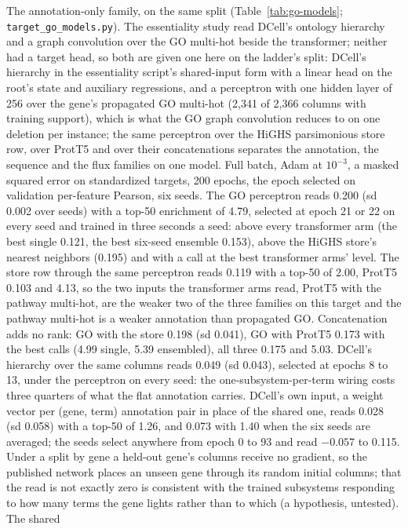 The annotation-only family, on the same split (Table~\ref{tab:go-models};
\texttt{target\_go\_models.py}). The essentiality study read DCell's ontology hierarchy
and a graph convolution over the GO multi-hot beside the transformer; neither had a
target head, so both are given one here on the ladder's split: DCell's hierarchy in the
essentiality script's shared-input form with a linear head on the root's state and
auxiliary regressions, and a perceptron with one hidden layer of 256 over the gene's
propagated GO multi-hot (2,341 of 2,366 columns with training support), which is what
the GO graph convolution reduces to on one deletion per instance; the same perceptron
over the HiGHS parsimonious store row, over ProtT5 and over their concatenations
separates the annotation, the sequence and the flux families on one model. Full batch,
Adam at $10^{-3}$, a masked squared error on standardized targets, 200 epochs, the
epoch selected on validation per-feature Pearson, six seeds. The GO perceptron reads
0.200 (sd 0.002 over seeds) with a top-50 enrichment of 4.79, selected at epoch 21 or
22 on every seed and trained in three seconds a seed: above every transformer arm (the
best single 0.121, the best six-seed ensemble 0.153), above the HiGHS store's nearest
neighbors (0.195) and with a call at the best transformer arms' level. The store row
through the same perceptron reads 0.119 with a top-50 of 2.00, ProtT5 0.103 and 4.13,
so the two inputs the transformer arms read, ProtT5 with the pathway multi-hot, are
the weaker two of the three families on this target and the pathway multi-hot is a
weaker annotation than propagated GO. Concatenation adds no rank: GO with the store
0.198 (sd 0.041), GO with ProtT5 0.173 with the best calls (4.99 single, 5.39
ensembled), all three 0.175 and 5.03. DCell's hierarchy over the same columns reads
0.049 (sd 0.043), selected at epochs 8 to 13, under the perceptron on every seed: the
one-subsystem-per-term wiring costs three quarters of what the flat annotation carries.
DCell's own input, a weight vector per (gene, term) annotation pair in place of the
shared one, reads 0.028 (sd 0.058) with a top-50 of 1.26, and 0.073 with 1.40 when the
six seeds are averaged; the seeds select anywhere from epoch 0 to 93 and read $-0.057$
to 0.115. Under a split by gene a held-out gene's columns receive no gradient, so the
published network places an unseen gene through its random initial columns; that the
read is not exactly zero is consistent with the trained subsystems responding to how
many terms the gene lights rather than to which (a hypothesis, untested). The shared
